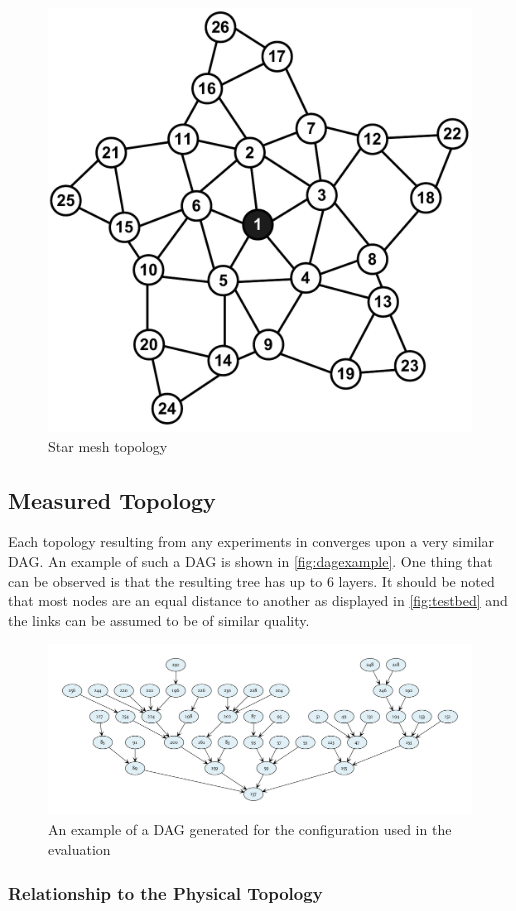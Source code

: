 \begin{figure}
  \centering
  \includegraphics[width=.5\textwidth]{../images/sim_star_new.pdf}
  \caption{Star mesh topology \cite{mueller2017}}
  \label{fig:meshstar}
\end{figure}

\subsection{Measured Topology}

Each topology resulting from any experiments in \fitlab converges upon a very similar
\acs{DAG}. An example of such a \ac{DAG} is shown in \autoref{fig:dagexample}.
One thing that can be observed is that the resulting tree has up to 6 layers.
It should be noted that most nodes are an equal distance to another as displayed
in \autoref{fig:testbed} and the links can be assumed to be of similar quality.

\begin{figure}
  \centering
  \includegraphics[width=\textwidth]{../images/dag.pdf}
  \caption{An example of a DAG generated for the configuration used in the evaluation}
  \label{fig:dagexample}
\end{figure}

\subsubsection{Relationship to the Physical Topology}

